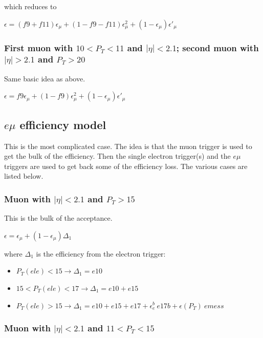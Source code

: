 \noindent which reduces to 

\begin{center}
$\epsilon = (f9+f11)\epsilon_{\mu} + (1-f9-f11)\epsilon_{\mu}^2
+ (1-\epsilon_{\mu})\epsilon'_{\mu}$
\end{center}

\subsubsection{First muon with $10<P_T<11$ and $|\eta|<2.1$;  second muon 
with $|\eta|>2.1$ and $P_T>20$}
Same basic idea as above.

\begin{center}
$\epsilon = f9\epsilon_{\mu} + (1-f9)\epsilon_{\mu}^2
+ (1-\epsilon_{\mu})\epsilon'_{\mu}$
\end{center}

\subsection{$e\mu$ efficiency model}
\label{sec:emumodel}

This is the most complicated case.  The idea is that the muon trigger
is used to get the bulk of the efficiency.  Then the single electron 
trigger(s) and the $e\mu$ triggers are used to get back some of the 
efficiency loss.  The various cases are listed below.

\subsubsection{Muon with $|\eta|<2.1$ and $P_T>15$}
This is the bulk of the acceptance.

\begin{center}
$\epsilon = \epsilon_{\mu} + (1-\epsilon_{\mu})\Delta_1$ 
\end{center}

where $\Delta_1$ is the efficiency from the electron trigger:
\begin{itemize}
\item $P_T(ele)<15 \to \Delta_1=e10$
\item $15<P_T(ele)<17 \to \Delta_1=e10+e15$
\item $P_T(ele)>15 \to \Delta_1=e10+e15+e17+\epsilon_e^b~e17b+\epsilon(P_T)~emess$
\end{itemize}
 

\subsubsection{Muon with $|\eta|<2.1$ and $11<P_T<15$}

